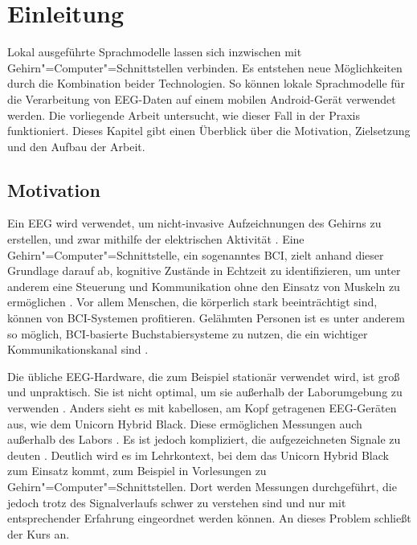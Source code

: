 \chapter{Einleitung}
\label{ch:einleitung}
Lokal ausgeführte Sprachmodelle lassen sich inzwischen mit Gehirn"=Computer"=Schnittstellen verbinden. Es entstehen neue Möglichkeiten durch die Kombination beider Technologien. So können lokale Sprachmodelle für die Verarbeitung von \ac{EEG}-Daten auf einem mobilen Android-Gerät verwendet werden. Die vorliegende Arbeit untersucht, wie dieser Fall in der Praxis funktioniert. Dieses Kapitel gibt einen Überblick über die Motivation, Zielsetzung und den Aufbau der Arbeit.

\section{Motivation}
\label{sec:motivation}
Ein \ac{EEG} wird verwendet, um nicht-invasive Aufzeichnungen des Gehirns zu erstellen, und zwar mithilfe der elektrischen Aktivität \autocite{blum2017}.
Eine Gehirn"=Computer"=Schnittstelle, ein sogenanntes \ac{BCI}, zielt anhand dieser Grundlage darauf ab, kognitive Zustände in Echtzeit zu identifizieren, um unter anderem eine Steuerung und Kommunikation ohne den Einsatz von Muskeln zu ermöglichen \autocite{blum2017, wolpaw2013}.
Vor allem Menschen, die körperlich stark beeinträchtigt sind, können von \ac{BCI}-Systemen profitieren. Gelähmten Personen ist es unter anderem so möglich, \ac{BCI}-basierte Buchstabiersysteme zu nutzen, die ein wichtiger Kommunikationskanal sind \autocite{blum2017}.
\vspace{\baselineskip}

\noindent Die übliche \ac{EEG}-Hardware, die zum Beispiel stationär verwendet wird, ist groß und unpraktisch. Sie ist nicht optimal, um sie außerhalb der Laborumgebung zu verwenden \autocite{blum2017}. Anders sieht es mit kabellosen, am Kopf getragenen \ac{EEG}-Geräten aus, wie dem Unicorn Hybrid Black. Diese ermöglichen Messungen auch außerhalb des Labors \autocite{unicornproduct, blum2017}.
Es ist jedoch kompliziert, die aufgezeichneten Signale zu deuten \autocite{blum2017}.
Deutlich wird es im Lehrkontext, bei dem das Unicorn Hybrid Black zum Einsatz kommt, zum Beispiel in Vorlesungen zu Gehirn"=Computer"=Schnittstellen. Dort werden Messungen durchgeführt, die jedoch trotz des Signalverlaufs schwer zu verstehen sind und nur mit entsprechender Erfahrung eingeordnet werden können. An dieses Problem schließt der Kurs an.
\vspace{\baselineskip}

